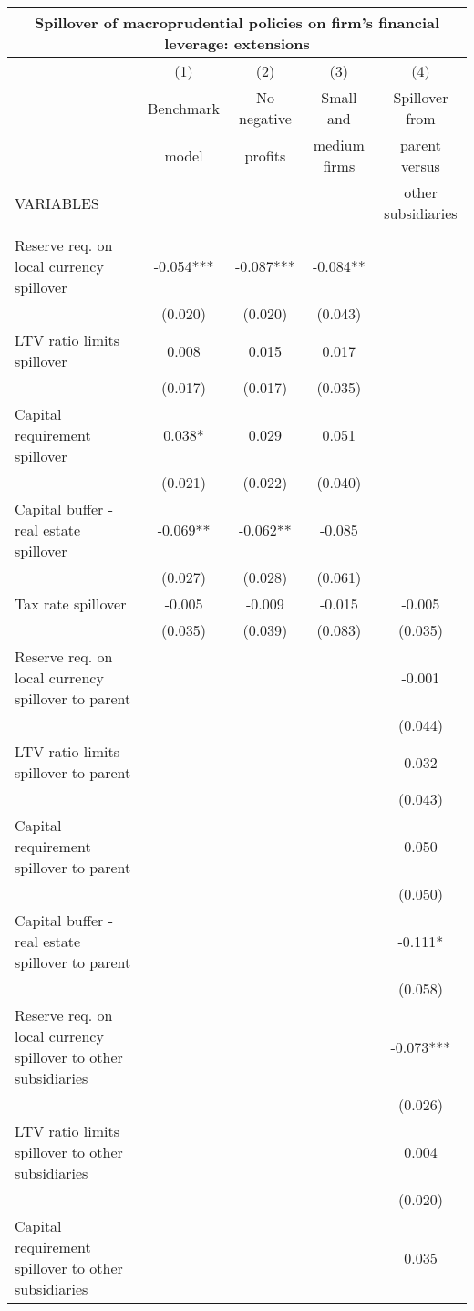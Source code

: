 \begin{tabular}{lcccc}
\multicolumn{5}{c}{Spillover of macroprudential policies on firm's financial leverage: extensions} \\ \hline
 & (1) & (2) & (3) & (4) \\
 & Benchmark & No negative & Small and & Spillover from \\
 & model & profits & medium firms & parent versus \\
VARIABLES &  &  &  & other subsidiaries \\ \hline
 &  &  &  &  \\
Reserve req. on local currency spillover & -0.054*** & -0.087*** & -0.084** &  \\
 & (0.020) & (0.020) & (0.043) &  \\
LTV ratio limits spillover & 0.008 & 0.015 & 0.017 &  \\
 & (0.017) & (0.017) & (0.035) &  \\
Capital requirement spillover & 0.038* & 0.029 & 0.051 &  \\
 & (0.021) & (0.022) & (0.040) &  \\
Capital buffer - real estate spillover & -0.069** & -0.062** & -0.085 &  \\
 & (0.027) & (0.028) & (0.061) &  \\
Tax rate spillover & -0.005 & -0.009 & -0.015 & -0.005 \\
 & (0.035) & (0.039) & (0.083) & (0.035) \\
Reserve req. on local currency spillover to parent &  &  &  & -0.001 \\
 &  &  &  & (0.044) \\
LTV ratio limits spillover to parent &  &  &  & 0.032 \\
 &  &  &  & (0.043) \\
Capital requirement spillover to parent &  &  &  & 0.050 \\
 &  &  &  & (0.050) \\
Capital buffer - real estate spillover to parent &  &  &  & -0.111* \\
 &  &  &  & (0.058) \\
Reserve req. on local currency spillover to other subsidiaries &  &  &  & -0.073*** \\
 &  &  &  & (0.026) \\
LTV ratio limits spillover to other subsidiaries &  &  &  & 0.004 \\
 &  &  &  & (0.020) \\
Capital requirement spillover to other subsidiaries &  &  &  & 0.035 \\

\end{tabular}
